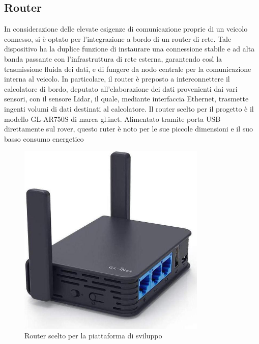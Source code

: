 \subsection{Router}
In considerazione delle elevate esigenze di comunicazione proprie di un veicolo connesso, si è optato per l'integrazione a bordo di un router di rete. Tale dispositivo ha la duplice funzione di instaurare una connessione stabile e ad alta banda passante con l'infrastruttura di rete esterna, garantendo così la trasmissione fluida dei dati, e di fungere da nodo centrale per la comunicazione interna al veicolo. In particolare, il router è preposto a interconnettere il calcolatore di bordo, deputato all'elaborazione dei dati provenienti dai vari sensori, con il sensore Lidar, il quale, mediante interfaccia Ethernet, trasmette ingenti volumi di dati destinati al calcolatore. Il router scelto per il progetto è il modello GL-AR750S di marca gl.inet. Alimentato tramite porta USB direttamente sul rover, questo ruter è noto per le sue piccole dimensioni e il suo basso consumo energetico

\begin{figure}[H]
  \centering
  \includegraphics[width=0.8\textwidth]{figures/router.jpg}
  \caption{Router scelto per la piattaforma di sviluppo}
  \label{router}
\end{figure}
